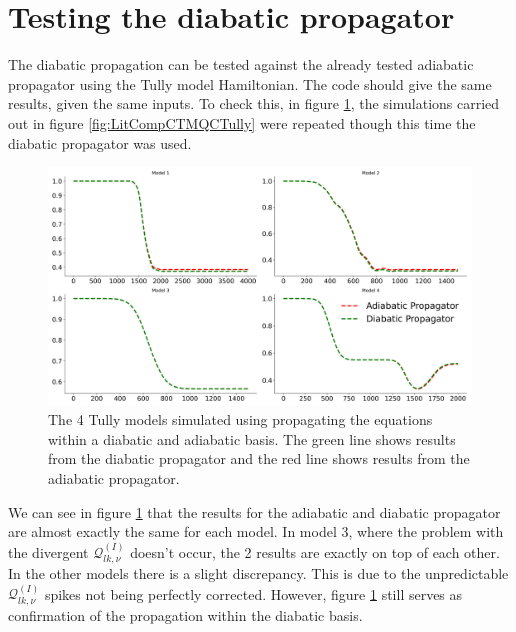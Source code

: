 \section{Testing the diabatic propagator}
The diabatic propagation can be tested against the already tested adiabatic propagator using the Tully model Hamiltonian. The code should give the same results, given the same inputs. To check this, in figure \ref{fig:diab_prop_vs_adiab}, the simulations carried out in figure \ref{fig:LitCompCTMQCTully} were repeated though this time the diabatic propagator was used.
\begin{figure}[h]
  \includegraphics[width=\textwidth]{./img/CTMQC/TullyModels/CTMQC_ad_vs_di_wTraj_pops.png}
  \caption{\label{fig:diab_prop_vs_adiab}The 4 Tully models simulated using propagating the equations within a diabatic and adiabatic basis. The green line shows results from the diabatic propagator and the red line shows results from the adiabatic propagator.}
\end{figure}
We can see in figure \ref{fig:diab_prop_vs_adiab} that the results for the adiabatic and diabatic propagator are almost exactly the same for each model. In model 3, where the problem with the divergent $\mathcal{Q}_{lk, \nu}^{(I)}$ doesn't occur, the 2 results are exactly on top of each other. In the other models there is a slight discrepancy. This is due to the unpredictable $\mathcal{Q}_{lk, \nu}^{(I)}$ spikes not being perfectly corrected. However, figure \ref{fig:diab_prop_vs_adiab} still serves as confirmation of the propagation within the diabatic basis.

